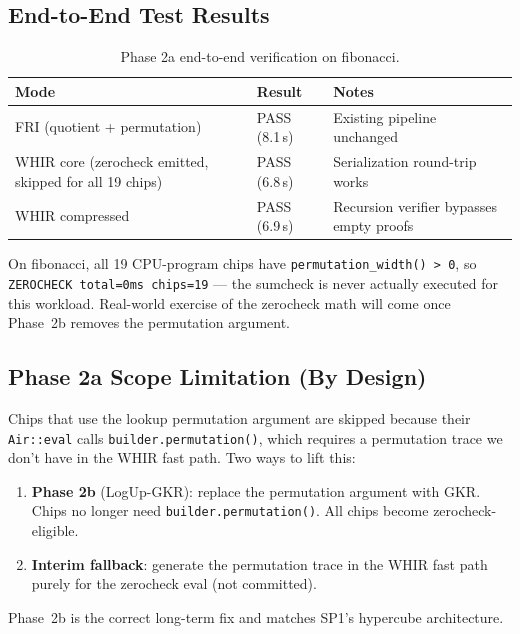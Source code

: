 \subsection{End-to-End Test Results}

\begin{table}[h]
\centering
\begin{tabular}{lll}
\toprule
\textbf{Mode} & \textbf{Result} & \textbf{Notes} \\
\midrule
FRI (quotient + permutation)                            & PASS (8.1\,s) & Existing pipeline unchanged \\
WHIR core (zerocheck emitted, skipped for all 19 chips) & PASS (6.8\,s) & Serialization round-trip works \\
WHIR compressed                                          & PASS (6.9\,s) & Recursion verifier bypasses empty proofs \\
\bottomrule
\end{tabular}
\caption{Phase 2a end-to-end verification on fibonacci.}
\label{tab:phase2a-e2e}
\end{table}

On fibonacci, all 19 CPU-program chips have \texttt{permutation\_width() > 0},
so \texttt{ZEROCHECK total=0ms chips=19} --- the sumcheck is never actually
executed for this workload.  Real-world exercise of the zerocheck math
will come once Phase~2b removes the permutation argument.

\subsection{Phase 2a Scope Limitation (By Design)}

Chips that use the lookup permutation argument are skipped because their
\texttt{Air::eval} calls \texttt{builder.permutation()}, which requires a
permutation trace we don't have in the WHIR fast path.  Two ways to lift
this:

\begin{enumerate}
  \item \textbf{Phase 2b} (LogUp-GKR): replace the permutation argument
        with GKR.  Chips no longer need \texttt{builder.permutation()}.
        All chips become zerocheck-eligible.
  \item \textbf{Interim fallback}: generate the permutation trace in the
        WHIR fast path purely for the zerocheck eval (not committed).
\end{enumerate}

Phase~2b is the correct long-term fix and matches SP1's hypercube
architecture.

